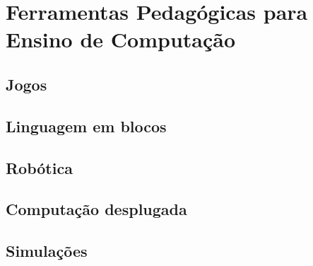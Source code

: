 
\chapter{Ferramentas Pedagógicas para Ensino de Computação}
\label{related_tools}

\section{Jogos}


\section{Linguagem em blocos}


\section{Robótica}


\section{Computação desplugada}


\section{Simulações}


